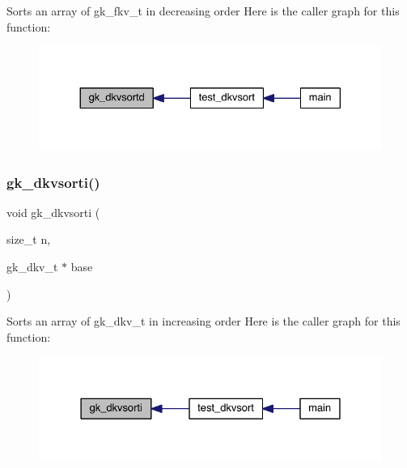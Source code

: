 Sorts an array of gk\+\_\+fkv\+\_\+t in decreasing order Here is the caller graph for this function\+:\nopagebreak
\begin{figure}[H]
\begin{center}
\leavevmode
\includegraphics[width=330pt]{a00077_ac5138047355892676b7cb38afcfa8361_icgraph}
\end{center}
\end{figure}
\mbox{\label{a00077_a463fd9b2f6adc1b05983f90eb398bd10}} 
\subsubsection{\texorpdfstring{gk\+\_\+dkvsorti()}{gk\_dkvsorti()}}
{\footnotesize\ttfamily void gk\+\_\+dkvsorti (\begin{DoxyParamCaption}\item[{size\+\_\+t}]{n,  }\item[{gk\+\_\+dkv\+\_\+t $\ast$}]{base }\end{DoxyParamCaption})}

Sorts an array of gk\+\_\+dkv\+\_\+t in increasing order Here is the caller graph for this function\+:\nopagebreak
\begin{figure}[H]
\begin{center}
\leavevmode
\includegraphics[width=328pt]{a00077_a463fd9b2f6adc1b05983f90eb398bd10_icgraph}
\end{center}
\end{figure}
\mbox{\label{a00077_a2a9dbcb6a3f167b0fd20e431612e5aa9}} 
